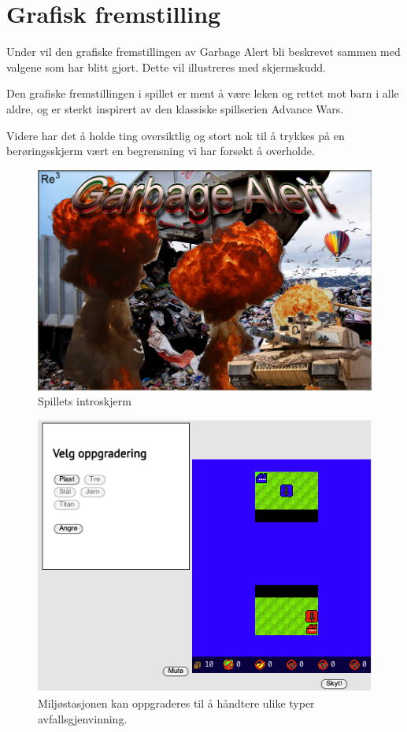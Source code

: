 \section{Grafisk fremstilling}\label{sec:artwork}
Under vil den grafiske fremstillingen av Garbage Alert bli beskrevet sammen med valgene som har blitt gjort. Dette vil illustreres med skjermskudd.

Den grafiske fremstillingen i spillet er ment å være leken og rettet mot barn i alle aldre, og er sterkt inspirert av den klassiske spillserien Advance Wars.

Videre har det å holde ting oversiktlig og stort nok til å trykkes på en berøringsskjerm vært en begrensning vi har forsøkt å overholde.


\begin{figure} [H]
\centering
\includegraphics[width=\textwidth]{images/splashscreen.png}
\caption{Spillets introskjerm}
\label{fig:splashscreen}
\end{figure}

\begin{figure} [H]
\centering
\includegraphics[width=\textwidth]{images/Oppgradering.png}
\caption{Miljøstasjonen kan oppgraderes til å håndtere ulike typer avfallsgjenvinning.}
\label{fig:Oppgradering}
\end{figure}

